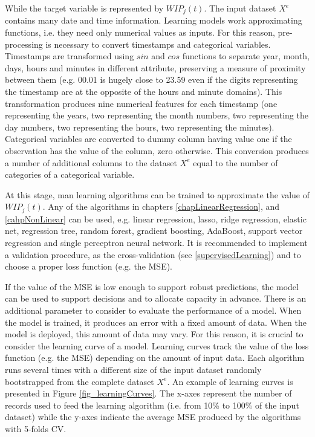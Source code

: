While the target variable is represented by $WIP_j(t)$. The input dataset $X^e$ contains many date and time information. Learning models work approximating functions, i.e. they need only numerical values as inputs. For this reason, pre-processing is necessary to convert timestamps and categorical variables. Timestamps are transformed using $sin$ and $cos$ functions to separate year, month, days, hours and minutes in different attribute, preserving a measure of proximity between them (e.g. 00.01 is hugely close to 23.59 even if the digits representing the timestamp are at the opposite of the hours and minute domains). This transformation produces nine numerical features for each timestamp (one representing the years, two representing the month numbers, two representing the day numbers, two representing the hours, two representing the minutes). Categorical variables are converted to dummy column having value one if the observation has the value of the column, zero otherwise. This conversion produces a number of additional columns to the dataset $X^e$ equal to the number of categories of a categorical variable.\par

At this stage, man learning algorithms can be trained to approximate the value of $WIP_j(t)$. Any of the algorithms in chapters \ref{chapLinearRegression}, and \ref{cahpNonLinear} can be used, e.g. linear regression, lasso, ridge regression, elastic net, regression tree, random forest, gradient boosting, AdaBoost, support vector regression and single perceptron neural network. It is recommended to implement a validation procedure, as the cross-validation (see \ref{supervisedLearning}) and to choose a proper loss function (e.g. the MSE).\par

If the value of the MSE is low enough to support robust predictions, the model can be used to support decisions and to allocate capacity in advance. There is an additional parameter to consider to evaluate the performance of a model. When the model is trained, it produces an error with a fixed amount of data. When the model is deployed, this amount of data may vary. For this reason, it is crucial to consider the learning curve of a model. Learning curves track the value of the loss function (e.g. the MSE) depending on the amount of input data. Each algorithm runs several times with a different size of the input dataset randomly bootstrapped from the complete dataset $X^e$. An example of learning curves is presented in Figure \ref{fig_learningCurves}. The x-axes represent the number of records used to feed the learning algorithm (i.e. from 10\% to 100\% of the input dataset) while the y-axes indicate the average MSE produced by the algorithms with 5-folds CV.

